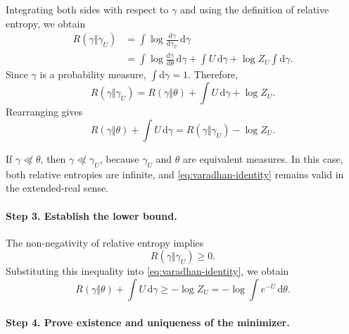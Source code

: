 \documentclass[12pt,a4paper,oneside]{book}
\begin{document}
\begin{solution}
Integrating both sides with respect to $\gamma$ and using the
definition of relative entropy, we obtain
\begin{equation*}
    \begin{aligned}
        R(\gamma\Vert\gamma_U)
        &=
        \int
        \log\frac{\mathrm d\gamma}{\mathrm d\gamma_U}
        \,\mathrm d\gamma\\
        &=
        \int
        \log\frac{\mathrm d\gamma}{\mathrm d\theta}
        \,\mathrm d\gamma
        +\int U\,\mathrm d\gamma
        +\log Z_U\int\mathrm d\gamma.
    \end{aligned}
\end{equation*}
Since $\gamma$ is a probability measure,
$\int\mathrm d\gamma=1$. Therefore,
\begin{equation*}
    R(\gamma\Vert\gamma_U)
    =
    R(\gamma\Vert\theta)
    +\int U\,\mathrm d\gamma
    +\log Z_U.
\end{equation*}
Rearranging gives
\begin{equation}
    \boxed{
    R(\gamma\Vert\theta)+\int U\,\mathrm d\gamma
    =
    R(\gamma\Vert\gamma_U)-\log Z_U.
    }
    \label{eq:varadhan-identity}
\end{equation}

If $\gamma\not\ll\theta$, then $\gamma\not\ll\gamma_U$,
because $\gamma_U$ and $\theta$ are equivalent measures.
In this case, both relative entropies are infinite, and
\eqref{eq:varadhan-identity} remains valid in the extended-real
sense.

\paragraph{Step 3. Establish the lower bound.}

The non-negativity of relative entropy implies
\begin{equation*}
    R(\gamma\Vert\gamma_U)\geq 0.
\end{equation*}
Substituting this inequality into
\eqref{eq:varadhan-identity}, we obtain
\begin{equation*}
    \boxed{
    R(\gamma\Vert\theta)+\int U\,\mathrm d\gamma
    \geq
    -\log Z_U
    =
    -\log\int e^{-U}\,\mathrm d\theta.
    }
\end{equation*}

\paragraph{Step 4. Prove existence and uniqueness of the minimizer.}


\end{solution}
\end{document}

